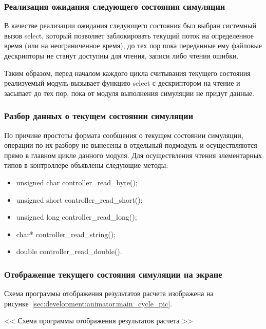 \subsubsection{Реализация ожидания следующего состояния симуляции}
\label{sec:development:animator:wait}

В качестве реализации ожидания следующего состояния был выбран системный вызов select,
который позволяет заблокировать текущий поток на определенное время (или на неограниченное время),
до тех пор пока переданные ему файловые дескрипторы не станут доступны для чтения, записи либо чтения ошибки.

Таким образом, перед началом каждого цикла считывания текущего состояния реализуемый модуль вызывает функцию select с дескриптором на чтение и засыпает до тех пор,
пока от модуля выполнения симуляции не придут данные.

\subsubsection{Разбор данных о текущем состоянии симуляции}
\label{sec:development:animator:parse}

По причине простоты формата сообщения о текущем состоянии симуляции, операции по их разбору не вынесены в отдельный подмодуль и осуществляются прямо в главном цикле данного модуля.
Для осуществления чтения элементарных типов в контроллере объявлены следующие методы:
\begin{itemize}
  \item unsigned char controller\_read\_byte();
  \item unsigned short controller\_read\_short();
  \item unsigned long controller\_read\_long();
  \item char* controller\_read\_string();
  \item double controller\_read\_double().
\end{itemize}

\subsubsection{Отображение текущего состояния симуляции на экране}
\label{sec:development:animator:show}

Схема программы отображения результатов расчета изображена на рисунке~\ref{sec:development:animator:main_cycle_pic}.

<< Схема программы отображения результатов расчета >>

